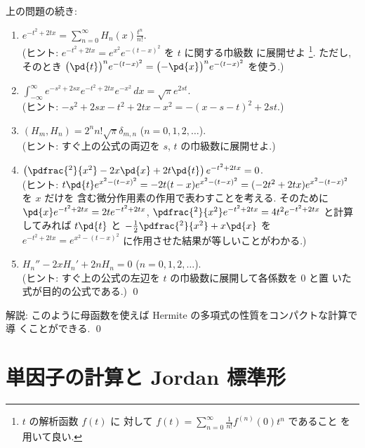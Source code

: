 \documentclass[12pt,twoside]{jarticle}
\begin{document}

\begin{question}
  上の問題の続き:
  \begin{enumerate}
  \item $\displaystyle e^{-t^2+2tx} = \sum_{n=0}^\infty H_n(x)\frac{t^n}{n!}$.
    \\(ヒント: $e^{-t^2+2tx} = e^{x^2} e^{-(t-x)^2}$ を $t$ に関する巾級数
    に展開せよ%
    \footnote{$t$ の解析函数 $f(t)$ に
      対して $f(t) = \sum_{n=0}^\infty \frac{1}{n!}f^{(n)}(0)t^n$ であること
      を用いて良い.}.
    ただし, そのとき $\bigl(\pd{t}\bigr)^n e^{-(t-x)^2}
    =\bigl(-\pd{x}\bigr)^n e^{-(t-x)^2}$ を使う.)
  \item $\int_{-\infty}^\infty e^{-s^2+2sx}e^{-t^2+2tx}e^{-x^2}\,dx
    = \sqrt{\pi} e^{2st}.$ 
    \\(ヒント: $-s^2+2sx-t^2+2tx-x^2 = - (x-s-t)^2 + 2st$.)
  \item $(H_m, H_n)=2^n n!\sqrt{\pi} \delta_{m,n}$ \quad ($n=0,1,2,\ldots$).
    \\(ヒント: すぐ上の公式の両辺を $s$, $t$ の巾級数に展開せよ.)
  \item $\left(\pdfrac{^2}{x^2} - 2x \pd{x} + 2t \pd{t}\right)e^{-t^2+2tx}=0$.
    \\(ヒント: $t\pd{t}e^{x^2-(t-x)^2}
    = -2t(t-x)e^{x^2-(t-x)^2} = (-2t^2+2tx)e^{x^2-(t-x)^2}$ を $x$ だけを
    含む微分作用素の作用で表わすことを考える.
    そのために $\pd{x}e^{-t^2+2tx} = 2t e^{-t^2+2tx}$, 
    $\pdfrac{^2}{x^2}e^{-t^2+2tx} = 4t^2 e^{-t^2+2tx}$ 
    と計算してみれば $t\pd{t}$ と $-\frac{1}{2}\pdfrac{^2}{x^2}+x\pd{x}$ 
    を $e^{-t^2+2tx}=e^{x^2-(t-x)^2}$ に作用させた結果が等しいことがわかる.)
  \item $H_n'' - 2 x H_n' + 2n H_n = 0$ \quad ($n=0,1,2,\ldots$).
    \\(ヒント: すぐ上の公式の左辺を $t$ の巾級数に展開して各係数を $0$ と置
    いた式が目的の公式である.)
    \qed
  \end{enumerate}
\end{question}

\noindent
解説: このように母函数を使えば Hermite の多項式の性質をコンパクトな計算で導
くことができる. 
\qed


\section{単因子の計算と Jordan 標準形}
\label{sec:calc-elem-div-Jordan}
\end{document}
